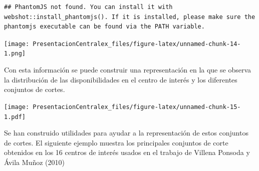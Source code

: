 \documentclass[
]{article}
\newenvironment{Shaded}{\begin{snugshade}}{\end{snugshade}}
\newcommand{\DataTypeTok}[1]{\textcolor[rgb]{0.13,0.29,0.53}{#1}}
\newcommand{\KeywordTok}[1]{\textcolor[rgb]{0.13,0.29,0.53}{\textbf{#1}}}
\newcommand{\NormalTok}[1]{#1}
\newcommand{\OperatorTok}[1]{\textcolor[rgb]{0.81,0.36,0.00}{\textbf{#1}}}
\newcommand{\StringTok}[1]{\textcolor[rgb]{0.31,0.60,0.02}{#1}}
\begin{document}
\begin{verbatim}
## PhantomJS not found. You can install it with webshot::install_phantomjs(). If it is installed, please make sure the phantomjs executable can be found via the PATH variable.
\end{verbatim}

\texttt{[image: PresentacionCentralex\_files/figure-latex/unnamed-chunk-14-1.png]}

Con esta información se puede construir una representación en la que se
observa la distribución de las disponibilidades en el centro de interés
y los diferentes conjuntos de cortes.

\begin{Shaded}
\end{Shaded}

\texttt{[image: PresentacionCentralex\_files/figure-latex/unnamed-chunk-15-1.pdf]}

Se han construido utilidades para ayudar a la representación de estos
conjuntos de cortes. El siguiente ejemplo muestra los principales
conjuntos de corte obtenidos en los 16 centros de interés usados en el
trabajo de Villena Ponsoda y Ávila Muñoz (2010)
\end{document}
